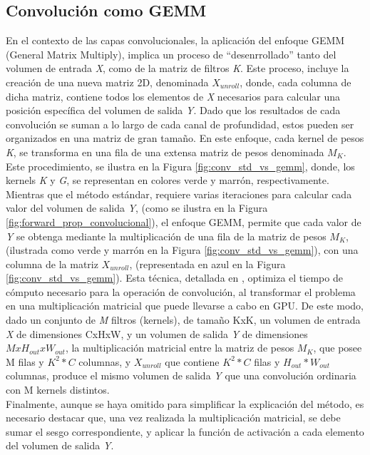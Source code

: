 \subsection{Convolución como GEMM \label{Intro_GEMMM}}

En el contexto de las capas convolucionales, la aplicación del enfoque GEMM (General Matrix Multiply), implica un proceso de ``desenrrollado'' tanto del volumen de entrada \textit{X}, como de la matriz de filtros \textit{K}. Este proceso, incluye la creación de una nueva matriz 2D, denominada $X_{unroll}$, donde, cada columna de dicha matriz, contiene todos los elementos de \textit{X} necesarios para calcular una posición específica del volumen de salida \textit{Y}. Dado que los resultados de cada convolución se suman a lo largo de cada canal de profundidad, estos pueden ser organizados en una matriz de gran tamaño. En este enfoque, cada kernel de pesos \textit{K}, se transforma en una fila de una extensa matriz de pesos denominada $M_{K}$. Este procedimiento, se ilustra en la Figura \ref{fig:conv_std_vs_gemm}, donde, los kernels \textit{K} y \textit{G}, se representan en colores verde y marrón, respectivamente. \\
Mientras que el método estándar, requiere varias iteraciones para calcular cada valor del volumen de salida \textit{Y}, (como se ilustra en la Figura \ref{fig:forward_prop_convolucional}), el enfoque GEMM, permite que cada valor de \textit{Y} se obtenga mediante la multiplicación de una fila de la matriz de pesos $M_{K}$, (ilustrada como verde y marrón en la Figura \ref{fig:conv_std_vs_gemm}), con una columna de la matriz $X_{unroll}$, (representada en azul en la Figura \ref{fig:conv_std_vs_gemm}). Esta técnica, detallada en \cite{Programming_Massively}, optimiza el tiempo de cómputo necesario para la operación de convolución, al transformar el problema en una multiplicación matricial que puede llevarse a cabo en GPU.
De este modo, dado un conjunto de \textit{M} filtros (kernels), de tamaño KxK, un volumen de entrada \textit{X} de dimensiones CxHxW, y un volumen de salida \textit{Y} de dimensiones $MxH_{out}xW_{out}$, la multiplicación matricial entre la matriz de pesos $M_{K}$, que posee M filas y $K^2*C$ columnas, y $X_{unroll}$ que contiene $K^2*C$ filas y $H_{out}*W_{out}$ columnas, produce el mismo volumen de salida \textit{Y} que una convolución ordinaria con M kernels distintos. \\
Finalmente, aunque se haya omitido para simplificar la explicación del método, es necesario destacar que, una vez realizada la multiplicación matricial, se debe sumar el sesgo correspondiente, y aplicar la función de activación a cada elemento del volumen de salida \textit{Y}.


